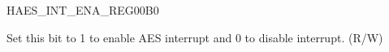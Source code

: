 \begin{register}{H}{AES\_INT\_ENA\_REG}{\hexprefix{}00B0}\label{regdesc:AESINTENAREG}
%
%
\regnewline%
\begin{regdesc}\begin{reglist}
\item [AES\_INT\_ENA] Set this bit to 1 to enable AES interrupt and 0 to disable interrupt. (R/W)
\end{reglist}\end{regdesc}
\end{register}
